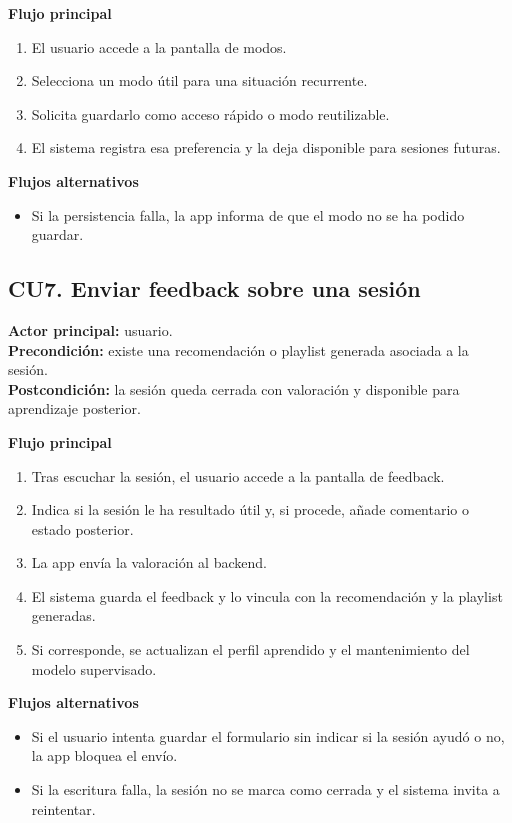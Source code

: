 \textbf{Flujo principal}
\begin{enumerate}[label=\arabic*.]
    \item El usuario accede a la pantalla de modos.
    \item Selecciona un modo útil para una situación recurrente.
    \item Solicita guardarlo como acceso rápido o modo reutilizable.
    \item El sistema registra esa preferencia y la deja disponible para sesiones futuras.
\end{enumerate}

\textbf{Flujos alternativos}
\begin{itemize}
    \item Si la persistencia falla, la app informa de que el modo no se ha podido guardar.
\end{itemize}

\subsection{CU7. Enviar feedback sobre una sesión}

\textbf{Actor principal:} usuario. \\
\textbf{Precondición:} existe una recomendación o playlist generada asociada a
la sesión. \\
\textbf{Postcondición:} la sesión queda cerrada con valoración y disponible para
aprendizaje posterior.

\textbf{Flujo principal}
\begin{enumerate}[label=\arabic*.]
    \item Tras escuchar la sesión, el usuario accede a la pantalla de feedback.
    \item Indica si la sesión le ha resultado útil y, si procede, añade comentario o estado posterior.
    \item La app envía la valoración al backend.
    \item El sistema guarda el feedback y lo vincula con la recomendación y la playlist generadas.
    \item Si corresponde, se actualizan el perfil aprendido y el mantenimiento del modelo supervisado.
\end{enumerate}

\textbf{Flujos alternativos}
\begin{itemize}
    \item Si el usuario intenta guardar el formulario sin indicar si la sesión ayudó o no, la app bloquea el envío.
    \item Si la escritura falla, la sesión no se marca como cerrada y el sistema invita a reintentar.
\end{itemize}

